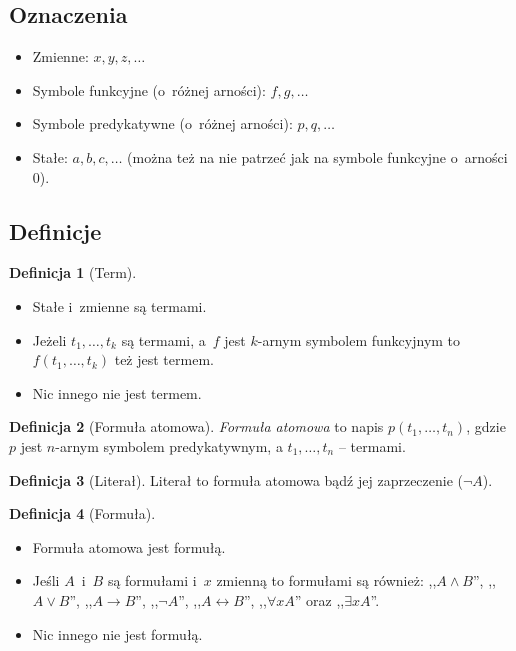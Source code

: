 \documentclass[10pt,a4paper]{article}
\theoremstyle{plain}
\theoremstyle{definition}
\newtheorem*{definition}{Definicja}
\newcommand{\impl}{\rightarrow}
\begin{document}
\subsection{Oznaczenia}
\begin{itemize}
  \item Zmienne: $x, y, z,\ldots$
  \item Symbole funkcyjne (o~różnej arności): $f, g,\ldots$
  \item Symbole predykatywne (o~różnej arności): $p, q,\ldots$
  \item Stałe: $a,b,c,\ldots$ (można też na nie patrzeć jak na symbole funkcyjne
    o~arności 0).
\end{itemize}

\subsection{Definicje}
\begin{definition}[Term]
  ~\begin{itemize}
    \item Stałe i~zmienne są termami.
    \item Jeżeli $t_1,\ldots,t_k$ są termami, a~$f$ jest $k$-arnym symbolem
      funkcyjnym to $f(t_1,\ldots,t_k)$ też jest termem.
    \item Nic innego nie jest termem.
  \end{itemize}
\end{definition}

\begin{definition}[Formuła atomowa]
  \emph{Formuła atomowa} to napis $p(t_1,\ldots,t_n)$, gdzie $p$ jest $n$-arnym
  symbolem predykatywnym, a $t_1,\ldots,t_n$ -- termami.
\end{definition}

\begin{definition}[Literał]
  Literał to formuła atomowa bądź jej zaprzeczenie ($\lnot A$).
\end{definition}

\begin{definition}[Formuła]
  ~\begin{itemize}
    \item Formuła atomowa jest formułą.
    \item Jeśli $A$~i~$B$ są formułami i~$x$ zmienną to formułami są również:
    ,,$A\land B$'', ,,$A\lor B$'', ,,$A\impl B$'', ,,$\lnot A$'',
    ,,$A\leftrightarrow B$'', ,,$\forall x A$'' oraz ,,$\exists x A$''.
    \item Nic innego nie jest formułą.
  \end{itemize}
\end{definition}
\end{document}
